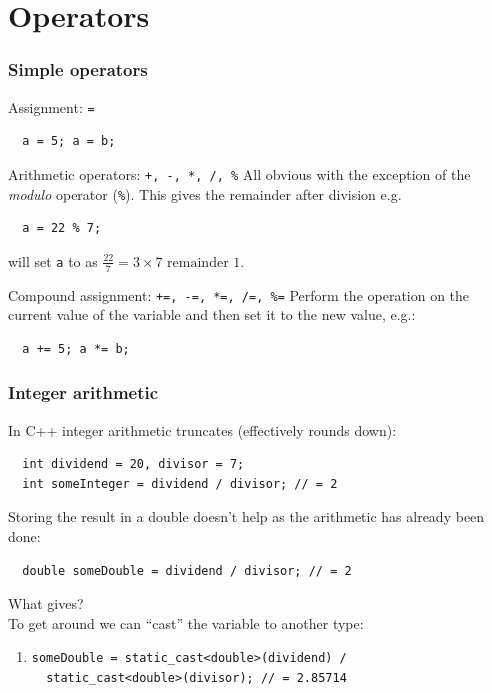 \documentclass{beamer}
\begin{document}
\section{Operators}

\begin{frame}[fragile]
 \frametitle{Simple operators}
 \begin{block}{Assignment: \texttt{=}}
    \begin{lstlisting}
  a = 5; a = b;
   \end{lstlisting}
  \end{block}
  \pause
  \begin{block}{Arithmetic operators: \texttt{+, -, *, /, \%}}
   All obvious with the exception of the \textit{modulo} operator (\texttt{\%}).  This gives the remainder after division e.g.
  \begin{lstlisting}
  a = 22 % 7;
  \end{lstlisting}
  will set \texttt{a} to  as $\frac{22}{7} = 3 \times 7 \text{ remainder } 1$.
 \end{block}
 \pause
 \begin{block}{Compound assignment: \texttt{+=, -=, *=, /=, \%=}}
  Perform the operation on the current value of the variable and then set it to the new value, e.g.:
  \begin{lstlisting}
  a += 5; a *= b;
  \end{lstlisting}
 \end{block} %
\end{frame}


\begin{frame}[fragile]
  \frametitle{Integer arithmetic}
  
  \begin{warnblocke}
  	In C++ integer arithmetic truncates (effectively rounds down):
  	\begin{lstlisting}
  int dividend = 20, divisor = 7;
  int someInteger = dividend / divisor; // = 2
  	\end{lstlisting}
  	Storing the result in a double doesn't help as the arithmetic has already been done:
  	\begin{lstlisting}
  double someDouble = dividend / divisor; // = 2
  	\end{lstlisting}
  	What gives?\\
  	\pause{}  To get around we can ``cast'' the variable to another type:
  	\begin{enumerate}
  	  \item{
  	  	\begin{lstlisting}
someDouble = static_cast<double>(dividend) /
  static_cast<double>(divisor); // = 2.85714
  	  	\end{lstlisting}}
  	  
  	\end{enumerate}
  \end{warnblocke}

\end{frame}
\end{document}
